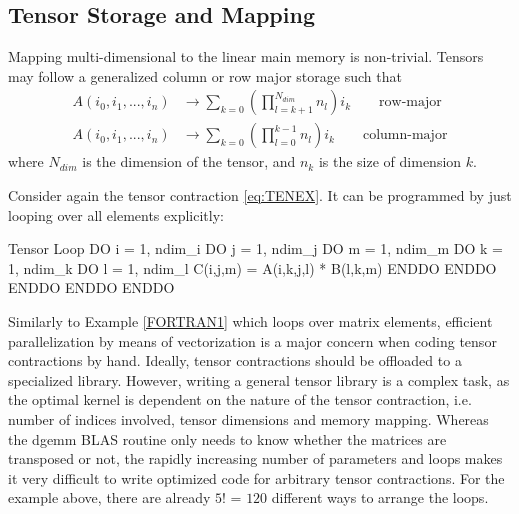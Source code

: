\subsection{Tensor Storage and Mapping \label{sec:tenstor}}

Mapping multi-dimensional to the linear main memory is non-trivial. Tensors may follow a generalized column or row major storage such that
\begin{align}
A(i_0,i_1,...,i_n) &\rightarrow \sum_{k=0} \left( \prod_{l=k+1}^{N_{dim}} n_l \right) i_k \qquad \textrm{row-major} \\
A(i_0,i_1,...,i_n) &\rightarrow \sum_{k=0} \left( \prod_{l=0}^{k-1} n_l \right) i_k \qquad \textrm{column-major} 
\end{align} 
\noindent where $N_{dim}$ is the dimension of the tensor, and $n_k$ is the size of dimension $k$.

Consider again the tensor contraction \ref{eq:TENEX}. It can be programmed by just looping over all elements explicitly:
\begin{fortran}{Tensor Loop \label{lst:TLOOP}}
DO i = 1, ndim_i
  DO j = 1, ndim_j
    DO m = 1, ndim_m
      DO k = 1, ndim_k
        DO l = 1, ndim_l
          C(i,j,m) = A(i,k,j,l) * B(l,k,m)
        ENDDO
      ENDDO
    ENDDO
  ENDDO
ENDDO
\end{fortran}
\noindent Similarly to Example \ref{FORTRAN1} which loops over matrix elements, efficient parallelization by means of vectorization is a major concern when coding tensor contractions by hand. Ideally, tensor contractions should be offloaded to a specialized library. However, writing a general tensor library is a complex task, as the optimal kernel is dependent on the nature of the tensor contraction, i.e. number of indices involved, tensor dimensions and memory mapping. Whereas the \textrm{dgemm} BLAS routine only needs to know whether the matrices are transposed or not, the rapidly increasing number of parameters and loops makes it very difficult to write optimized code for arbitrary tensor contractions. For the example above, there are already $5!$ = $120$ different ways to arrange the loops.  

